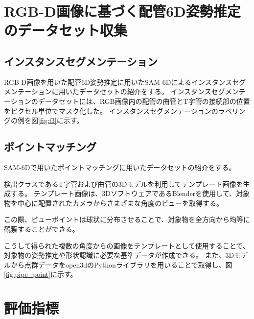 \section{RGB-D画像に基づく配管6D姿勢推定のデータセット収集}
\subsection{インスタンスセグメンテーション}
RGB-D画像を用いた配管6D姿勢推定に用いたSAM-6Dによるインスタンスセグメンテーションに用いたデータセットの紹介をする。
インスタンスセグメンテーションのデータセットには、RGB画像内の配管の曲管とT字管の接続部の位置をピクセル単位でマスク化した。
インスタンスセグメンテーションのラベリングの例を図\ref{fig:f3}に示す。

\subsection{ポイントマッチング}
SAM-6Dで用いたポイントマッチングに用いたデータセットの紹介をする。

検出クラスであるT字管および曲管の3Dモデルを利用してテンプレート画像を生成する。
テンプレート画像は、3DソフトウェアであるBlenderを使用して、対象物を中心に配置されたカメラからさまざまな角度のビューを取得する。

この際、ビューポイントは球状に分布させることで、対象物を全方向から均等に観察することができる。

こうして得られた複数の角度からの画像をテンプレートとして使用することで、対象物の姿勢推定や形状認識に必要な基準データが作成できる。
また、3Dモデルから点群データをopen3dのPythonライブラリを用いることで取得し、図\ref{fig:pipe_point}に示す。

\section{評価指標}
